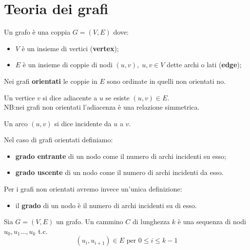 \chapter{Teoria dei grafi}
\begin{definizione}[Grafo]
    Un grafo è una coppia \(G=(V,E)\) dove:
    \begin{itemize}
        \item \(V\) è un insieme di vertici (\textbf{vertex});
        \item \(E\) è un insieme di coppie di nodi \((u,v),\;u,v\in V\) dette archi o lati (\textbf{edge});
    \end{itemize}
    Nei grafi \textbf{orientati} le coppie in \(E\) sono ordinate in quelli non orientati no.
\end{definizione}

\begin{definizione}[Adiacenza]
    Un vertice \(v\) si dice adiacente a \(u\) se esiste \((u,v) \in E\). \\
    NB:\@ nei grafi non orientati l'adiacenza è una relazione simmetrica.
\end{definizione}

\begin{definizione}
    Un arco \((u,v)\) si dice incidente da \(u\) a \(v\).
\end{definizione}

\begin{definizione}[Grado]
    Nel caso di grafi orientati definiamo:
    \begin{itemize}
        \item \textbf{grado entrante} di un nodo come il numero di archi incidenti su esso;
        \item \textbf{grado uscente} di un nodo come il numero di archi incidenti da esso.
    \end{itemize}
    Per i grafi non orientati avremo invece un'unica definizione:
    \begin{itemize}
        \item il \textbf{grado} di un nodo è il numero di archi incidenti su di esso.
    \end{itemize}
\end{definizione}

\begin{definizione}[Cammino]
    Sia \(G=(V,E)\) un grafo. Un cammino \(C\) di lunghezza \(k\) è una sequenza di nodi \(u_0,u_1 \dots, u_k\) t.c.
    \begin{equation}
        (u_i,u_{i+1})\in E \text{ per } 0 \leq i \leq k-1
    \end{equation}
\end{definizione}

